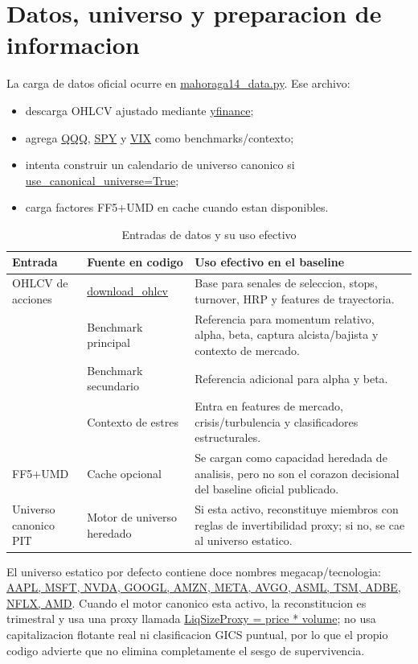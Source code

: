 \documentclass[11pt,letterpaper]{article}
\newcommand{\code}[1]{{\urlstyle{tt}\url{#1}}}
\begin{document}
\section{Datos, universo y preparacion de informacion}
La carga de datos oficial ocurre en \code{mahoraga14_data.py}. Ese archivo:

\begin{itemize}
    \item descarga OHLCV ajustado mediante \code{yfinance};
    \item agrega \code{QQQ}, \code{SPY} y \code{VIX} como benchmarks/contexto;
    \item intenta construir un calendario de universo canonico si \code{use_canonical_universe=True};
    \item carga factores FF5\(+\)UMD en cache cuando estan disponibles.
\end{itemize}

\begin{table}[H]
\centering
\caption{Entradas de datos y su uso efectivo}
\label{tab:data-inputs}
\begin{tabularx}{\textwidth}{>{\raggedright\arraybackslash}p{} >{\raggedright\arraybackslash}p{} X}
\toprule
\textbf{Entrada} & \textbf{Fuente en codigo} & \textbf{Uso efectivo en el baseline} \\
\midrule
OHLCV de acciones & \code{download_ohlcv} & Base para senales de seleccion, stops, turnover, HRP y features de trayectoria. \\
\code{QQQ} & Benchmark principal & Referencia para momentum relativo, alpha, beta, captura alcista/bajista y contexto de mercado. \\
\code{SPY} & Benchmark secundario & Referencia adicional para alpha y beta. \\
\code{VIX} & Contexto de estres & Entra en features de mercado, crisis/turbulencia y clasificadores estructurales. \\
FF5\(+\)UMD & Cache opcional & Se cargan como capacidad heredada de analisis, pero no son el corazon decisional del baseline oficial publicado. \\
Universo canonico PIT & Motor de universo heredado & Si esta activo, reconstituye miembros con reglas de invertibilidad proxy; si no, se cae al universo estatico. \\
\bottomrule
\end{tabularx}
\end{table}

El universo estatico por defecto contiene doce nombres megacap/tecnologia: \code{AAPL, MSFT, NVDA, GOOGL, AMZN, META, AVGO, ASML, TSM, ADBE, NFLX, AMD}. Cuando el motor canonico esta activo, la reconstitucion es trimestral y usa una proxy llamada \code{LiqSizeProxy = price * volume}; no usa capitalizacion flotante real ni clasificacion GICS puntual, por lo que el propio codigo advierte que no elimina completamente el sesgo de supervivencia.
\end{document}
